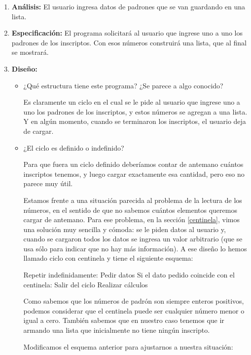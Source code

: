 \begin{enumerate}

\item {\bf Análisis:} El usuario ingresa datos de padrones que se van
guardando en una lista.

\item {\bf Especificación:} El programa solicitará al usuario que ingrese
uno a uno los padrones de los inscriptos. Con esos números construirá una
lista, que al final se mostrará.

\item {\bf Diseño:}
\begin{itemize}
\item ¿Qué estructura tiene este programa? ¿Se parece a algo conocido?

Es claramente un ciclo en el cual se le pide al usuario que ingrese uno a
uno los padrones de los inscriptos, y estos números se agregan a una lista.
Y en algún momento, cuando se terminaron los inscriptos, el usuario deja de
cargar.

\item ¿El ciclo es definido o indefinido?

Para que fuera un ciclo definido deberíamos contar de antemano cuántos
inscriptos tenemos, y luego cargar exactamente esa cantidad, pero eso no
parece muy útil.

Estamos frente a una situación parecida al problema de la lectura de los
números, en el sentido de que no sabemos cuántos elementos queremos cargar
de antemano. Para ese problema, en la sección \ref{centinela}, vimos una solución muy
sencilla y cómoda: se le piden datos al usuario y, cuando se cargaron todos
los datos se ingresa un valor arbitrario (que se usa sólo para indicar que
no hay más información). A ese diseño lo hemos llamado ciclo con centinela
y tiene el siguiente esquema:

\begin{codigo-nohl-sn}
Repetir indefinidamente:
    Pedir datos
    Si el dato pedido coincide con el centinela:
        Salir del ciclo
	Realizar cálculos
\end{codigo-nohl-sn}

Como sabemos que los números de padrón son siempre enteros positivos,
podemos considerar que el centinela puede ser cualquier número menor o
igual a cero.  También sabemos que en nuestro caso tenemos que ir armando
una lista que inicialmente no tiene ningún inscripto.

Modificamos el esquema anterior para ajustarnos a nuestra situación:


\end{itemize}
\end{enumerate}
